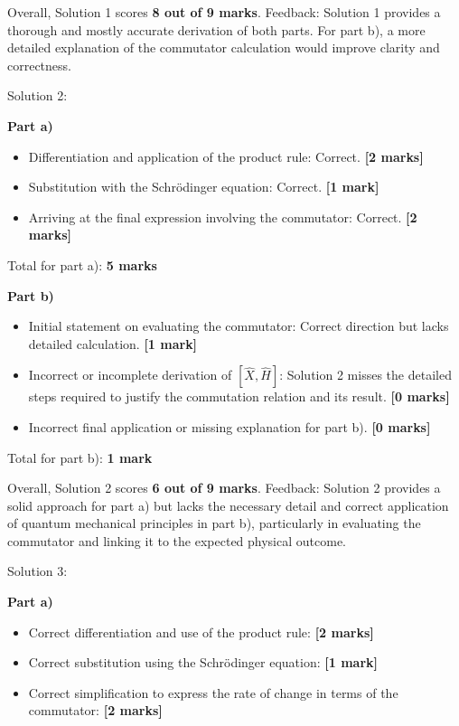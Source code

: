 \documentclass[a4paper,11pt]{article}
\begin{document}
Overall, Solution 1 scores \textbf{8 out of 9 marks}. Feedback: Solution 1 provides a thorough and mostly accurate derivation of both parts. For part b), a more detailed explanation of the commutator calculation would improve clarity and correctness.

Solution 2:

\textbf{Part a)}

\begin{itemize}
    \item Differentiation and application of the product rule: Correct. \textbf{[2 marks]}
    \item Substitution with the Schrödinger equation: Correct. \textbf{[1 mark]}
    \item Arriving at the final expression involving the commutator: Correct. \textbf{[2 marks]}
\end{itemize}

Total for part a): \textbf{5 marks}

\textbf{Part b)}

\begin{itemize}
    \item Initial statement on evaluating the commutator: Correct direction but lacks detailed calculation. \textbf{[1 mark]}
    \item Incorrect or incomplete derivation of \(\left[ \hat{X}, \hat{H}\right]\): Solution 2 misses the detailed steps required to justify the commutation relation and its result. \textbf{[0 marks]}
    \item Incorrect final application or missing explanation for part b). \textbf{[0 marks]}
\end{itemize}

Total for part b): \textbf{1 mark}

Overall, Solution 2 scores \textbf{6 out of 9 marks}. Feedback: Solution 2 provides a solid approach for part a) but lacks the necessary detail and correct application of quantum mechanical principles in part b), particularly in evaluating the commutator and linking it to the expected physical outcome.

Solution 3:

\textbf{Part a)}

\begin{itemize}
    \item Correct differentiation and use of the product rule: \textbf{[2 marks]}
    \item Correct substitution using the Schrödinger equation: \textbf{[1 mark]}
    \item Correct simplification to express the rate of change in terms of the commutator: \textbf{[2 marks]}
\end{itemize}
\end{document}
